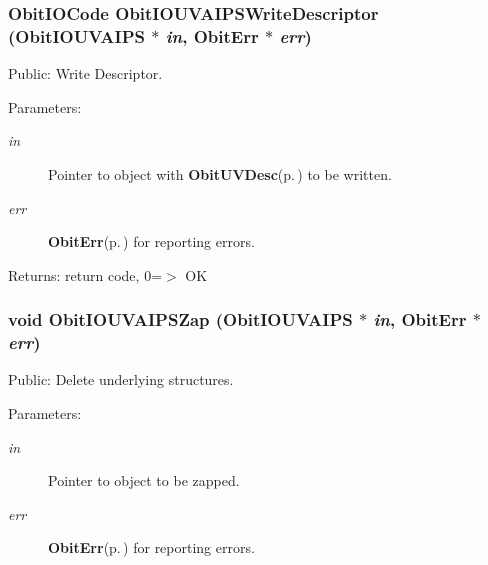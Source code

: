 \subsubsection{\setlength{\rightskip}{0pt plus 5cm}Obit\-IOCode Obit\-IOUVAIPSWrite\-Descriptor ({\bf Obit\-IOUVAIPS} $\ast$ {\em in}, {\bf Obit\-Err} $\ast$ {\em err})}\label{ObitIOUVAIPS_8c_a27}


Public: Write Descriptor. 

\begin{Desc}
\item[Parameters:]
\begin{description}
\item[{\em in}]Pointer to object with {\bf Obit\-UVDesc}{\rm (p.\,\pageref{structObitUVDesc})} to be written. \item[{\em err}]{\bf Obit\-Err}{\rm (p.\,\pageref{structObitErr})} for reporting errors. \end{description}
\end{Desc}
\begin{Desc}
\item[Returns:]return code, 0=$>$ OK \end{Desc}
\subsubsection{\setlength{\rightskip}{0pt plus 5cm}void Obit\-IOUVAIPSZap ({\bf Obit\-IOUVAIPS} $\ast$ {\em in}, {\bf Obit\-Err} $\ast$ {\em err})}\label{ObitIOUVAIPS_8c_a14}


Public: Delete underlying structures. 

\begin{Desc}
\item[Parameters:]
\begin{description}
\item[{\em in}]Pointer to object to be zapped. \item[{\em err}]{\bf Obit\-Err}{\rm (p.\,\pageref{structObitErr})} for reporting errors. \end{description}
\end{Desc}

